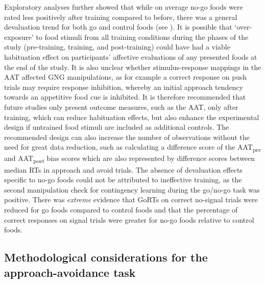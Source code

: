 \documentclass[man,floatsintext]{apa6}
\begin{document}
Exploratory analyses further showed that while on average no-go foods were rated less positively after training compared to before, there was a general devaluation trend for both go and control foods (see \textit{}). It is possible that `over-exposure' to food stimuli from all training conditions during the phases of the study (pre-training, training, and post-training) could have had a viable habituation effect on participants' affective evaluations of any presented foods at the end of the study. It is also unclear whether stimulus-response mappings in the AAT affected GNG manipulations, as for example a correct response on push trials may require response inhibition, whereby an initial approach tendency towards an appetitive food cue is inhibited. It is therefore recommended that future studies only present outcome measures, such as the AAT, only after training, which can reduce habituation effects, but also enhance the experimental design if untrained food stimuli are included as additional controls. The recommended design can also increase the number of observations without the need for great data reduction, such as calculating a difference score of the AAT\textsubscript{pre} and AAT\textsubscript{post} bias scores which are also represented by difference scores between median RTs in approach and avoid trials. The absence of devaluation effects specific to no-go foods could not be attributed to ineffective training, as the second manipulation check for contingency learning during the go/no-go task was positive. There was \emph{extreme} evidence that GoRTs on correct no-signal trials were reduced for go foods compared to control foods and that the percentage of correct responses on signal trials were greater for no-go foods relative to control foods.

\hypertarget{methodological-considerations-for-the-approach-avoidance-task}{%
\subsection{Methodological considerations for the approach-avoidance task}\label{methodological-considerations-for-the-approach-avoidance-task}}

\par
\end{document}
